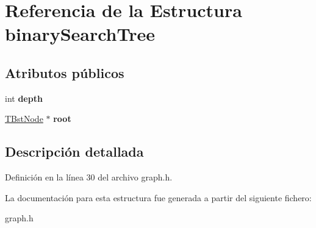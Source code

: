 \hypertarget{structbinary_search_tree}{}\section{Referencia de la Estructura binary\+Search\+Tree}
\label{structbinary_search_tree}
\subsection*{Atributos públicos}
\begin{DoxyCompactItemize}
\item 
\mbox{\label{structbinary_search_tree_a8903cb57b8154400af9266ff1cb6b1ca}} 
int {\bfseries depth}
\item 
\mbox{\label{structbinary_search_tree_abb4f38abc920d5ac7aa8f308528f6b5e}} 
\hyperlink{structbinary_search_tree_node}{T\+Bst\+Node} $\ast$ {\bfseries root}
\end{DoxyCompactItemize}


\subsection{Descripción detallada}


Definición en la línea 30 del archivo graph.\+h.



La documentación para esta estructura fue generada a partir del siguiente fichero\+:\begin{DoxyCompactItemize}
\item 
graph.\+h\end{DoxyCompactItemize}
